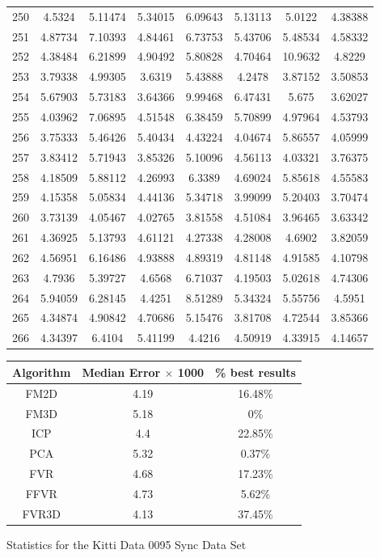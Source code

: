 \begin{figure}
\begin{tabular}{cccccccc}
250 & 4.5324 & 5.11474 & 5.34015 & 6.09643 & 5.13113 & 5.0122 & 4.38388\\
251 & 4.87734 & 7.10393 & 4.84461 & 6.73753 & 5.43706 & 5.48534 & 4.58332\\
252 & 4.38484 & 6.21899 & 4.90492 & 5.80828 & 4.70464 & 10.9632 & 4.8229\\
253 & 3.79338 & 4.99305 & 3.6319 & 5.43888 & 4.2478 & 3.87152 & 3.50853\\
254 & 5.67903 & 5.73183 & 3.64366 & 9.99468 & 6.47431 & 5.675 & 3.62027\\
255 & 4.03962 & 7.06895 & 4.51548 & 6.38459 & 5.70899 & 4.97964 & 4.53793\\
256 & 3.75333 & 5.46426 & 5.40434 & 4.43224 & 4.04674 & 5.86557 & 4.05999\\
257 & 3.83412 & 5.71943 & 3.85326 & 5.10096 & 4.56113 & 4.03321 & 3.76375\\
258 & 4.18509 & 5.88112 & 4.26993 & 6.3389 & 4.69024 & 5.85618 & 4.55583\\
259 & 4.15358 & 5.05834 & 4.44136 & 5.34718 & 3.99099 & 5.20403 & 3.70474\\
260 & 3.73139 & 4.05467 & 4.02765 & 3.81558 & 4.51084 & 3.96465 & 3.63342\\
261 & 4.36925 & 5.13793 & 4.61121 & 4.27338 & 4.28008 & 4.6902 & 3.82059\\
262 & 4.56951 & 6.16486 & 4.93888 & 4.89319 & 4.81148 & 4.91585 & 4.10798\\
263 & 4.7936 & 5.39727 & 4.6568 & 6.71037 & 4.19503 & 5.02618 & 4.74306\\
264 & 5.94059 & 6.28145 & 4.4251 & 8.51289 & 5.34324 & 5.55756 & 4.5951\\
265 & 4.34874 & 4.90842 & 4.70686 & 5.15476 & 3.81708 & 4.72544 & 3.85366\\
266 & 4.34397 & 6.4104 & 5.41199 & 4.4216 & 4.50919 & 4.33915 & 4.14657\\
\end{tabular}
\vspace{10mm}
\centering
\begin{tabular}{ccc}
\hline
\textbf{Algorithm} & \textbf{Median Error $\times$ 1000} & \textbf{\% best results}\\ \hline
FM2D	& 4.19 & 16.48\%\\
FM3D	& 5.18 & 0\%\\
ICP	& 4.4 & 22.85\%\\
PCA	& 5.32 & 0.37\%\\
FVR	& 4.68 & 17.23\%\\
FFVR	& 4.73 & 5.62\%\\
FVR3D	& 4.13 & 37.45\%\\
\end{tabular}
\caption{Statistics for the Kitti Data 0095 Sync Data Set}
\label{tab:kittidata0095sync}
\end{figure} 
